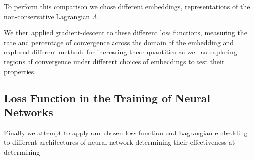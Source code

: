 To perform this comparison we chose different embeddings, representations of the non-conservative Lagrangian $\Lambda$.

We then applied gradient-descent\cite{gradientDescent} to these different loss functions, measuring the rate and percentage of convergence across the domain of the embedding and explored different methods for increasing these quantities as well as exploring regions of convergence under different choices of embeddings to test their properties.




\subsection{Loss Function in the Training of Neural Networks}

Finally we attempt to apply our chosen loss function and Lagrangian embedding to different architectures of neural network determining their effectiveness at determining

